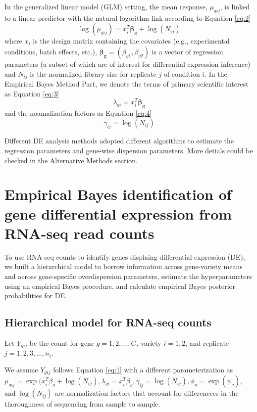 In the generalized linear model (GLM) setting, the mean response, $\mu_{gij}$, is linked to a  linear predictor with the natural logorithm link according to Equation \eqref{eq:2}
\begin{equation}
\label{eq:2}
\log(\mu_{gij}) = x_{i}^T\mathbf{\beta_g} + \log(N_{ij})
\end{equation}
where $x_{i}$ is the design matrix containing the covariates (e.g., experimental conditions, batch effects, etc.), $\mathbf{\beta_g} = (\beta_{g1}, \beta_{g2})$ is a vector of regression parameters (a subset of which are of interest for differential expression inference) and $N_{ij}$ is the normalized library size for replicate $j$ of condition $i$. In the Empirical Bayes Method Part, we denote the terms of primary scientific interest as Equation \eqref{eq:3}
\begin{equation}
\label{eq:3}
\lambda_{gi} = x_i ^T \mathbf{\beta_g}
\end{equation}
and the noamalization factors as Equation \eqref{eq:4}
\begin{equation}
\label{eq:4}
\gamma_{ij} = \log(N_{ij})
\end{equation}

Different DE analysis methods adopted different algorithms to estimate the regression parameters and gene-wise dispersion parameters. More detials could be checked in the Alternative Methods section. 


\section{Empirical Bayes identification of gene differential expression from RNA-seq read counts}


To use RNA-seq counts to identify genes displaing differential expression (DE), we built a hierarchical model to borrow information across gene-variety means and across gene-specific overdispersion parameters, estimate the hyperparameters using an empirical Bayes procedure, and calculate empirical Bayes posterior probabilities for DE. 

\subsection{Hierarchical model for RNA-seq counts}

Let $Y_{gij}$ be the count for gene $g=1,2,..., G$, variety $i=1,2$, and replicate $j=1,2,3,...,n_i$.

We assume $Y_{gij}$ follows Equation \eqref{eq:1} with a different parameterization as $\mu_{gij} = \exp(x_i^T \beta_g + \log(N_{ij}),\lambda_{gi} = x_i^T \beta_g, \gamma_{ij} =\log(N_{ij}), \phi_g = \exp(\psi_g)$, and $\log(N_{ij})$ are normalization factors that account for differencees in the thoroughness of sequencing from sample to sample. 

